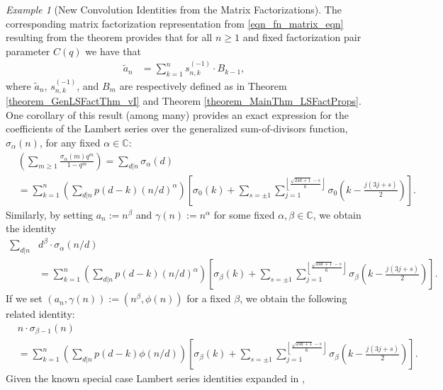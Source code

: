 \documentclass[10pt,reqno]{amsart}
\numberwithin{figure}{section}
\numberwithin{table}{section}
\theoremstyle{plain}
\numberwithin{theorem}{section}
\theoremstyle{remark}
\newtheorem{example}[theorem]{Example}
\begin{document}
\begin{example}[New Convolution Identities from the Matrix Factorizations]
The corresponding matrix factorization representation from \eqref{eqn_fn_matrix_eqn} 
resulting from the theorem provides that for all $n \geq 1$ and fixed 
factorization pair parameter $C(q)$ we have that 
\begin{align} 
\label{eqn_Tildean_MatrixEqn_Ident_examples}
\widetilde{a}_n & = \sum_{k=1}^n s_{n,k}^{(-1)} \cdot B_{k-1}, 
\end{align} 
where $\widetilde{a}_n$, $s_{n,k}^{(-1)}$, and $B_m$ are respectively defined as in 
Theorem \ref{theorem_GenLSFactThm_vI} and Theorem \ref{theorem_MainThm_LSFactProps}. 
One corollary of this result (among many) provides an exact expression for the 
coefficients of the Lambert series over the generalized sum-of-divisors function, 
$\sigma_{\alpha}(n)$, for any fixed $\alpha \in \mathbb{C}$: 
\begin{align*} 
[q^n] & \left(\sum_{m \geq 1} \frac{\sigma_{\alpha}(m) q^m}{1-q^m}\right) = 
     \sum_{d|n} \sigma_{\alpha}(d) \\ 
     & = 
     \sum_{k=1}^n \left(\sum_{d|n} p(d-k) (n/d)^{\alpha}\right) \left[ 
     \sigma_0(k) + \sum_{s = \pm 1} \sum_{j=1}^{\left\lfloor \frac{\sqrt{24k+1}-s}{6} \right\rfloor} 
     \sigma_0\left(k-\frac{j(3j+s)}{2}\right)\right].
\end{align*} 
Similarly, by setting $a_n := n^{\beta}$ and $\gamma(n) := n^{\alpha}$ 
for some fixed $\alpha, \beta \in \mathbb{C}$, we obtain the identity 
\begin{align*} 
     \sum_{d|n} & d^{\beta} \cdot \sigma_{\alpha}(n/d) \\ 
     & = 
     \sum_{k=1}^n \left(\sum_{d|n} p(d-k) (n/d)^{\alpha}\right) \left[ 
     \sigma_{\beta}(k) + \sum_{s = \pm 1} \sum_{j=1}^{\left\lfloor \frac{\sqrt{24k+1}-s}{6} \right\rfloor} 
     \sigma_{\beta}\left(k-\frac{j(3j+s)}{2}\right)\right].
\end{align*} 
If we set $(a_n, \gamma(n)) := (n^{\beta}, \phi(n))$ for a fixed $\beta$, we obtain the following 
related identity: 
\begin{align*} 
     & n \cdot \sigma_{\beta-1}(n) \\ 
     & = 
     \sum_{k=1}^n \left(\sum_{d|n} p(d-k) \phi(n/d)\right) \left[ 
     \sigma_{\beta}(k) + \sum_{s = \pm 1} \sum_{j=1}^{\left\lfloor \frac{\sqrt{24k+1}-s}{6} \right\rfloor} 
     \sigma_{\beta}\left(k-\frac{j(3j+s)}{2}\right)\right].
\end{align*} 
Given the known special case Lambert series identities expanded in \cite[\S 1; {\textit{cf.\ }} \S 3]{MERCA-SCHMIDT1}, 

\end{example}
\end{document}
